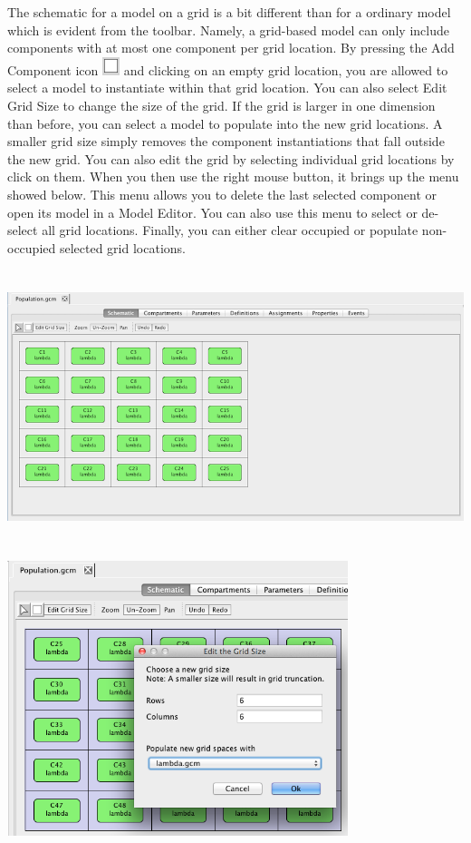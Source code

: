 \documentclass[titlepage,11pt]{article}
\begin{document}
The schematic for a model on a grid is a bit different than for a ordinary model which is evident from the toolbar.  Namely, a grid-based model can only include components with at most one component per grid location.  By pressing the Add Component icon \includegraphics{../gui/icons/modelview/add_component_selected} and clicking on an empty grid location, you are allowed to select a model to instantiate within that grid location.  You can also select Edit Grid Size to change the size of the grid.  If the grid is larger in one dimension than before, you can select a model to populate into the new grid locations.  A smaller grid size simply removes the component instantiations that fall outside the new grid.  You can also edit the grid by selecting individual grid locations by click on them.  When you then use the right mouse button, it brings up the menu showed below.  This menu allows you to delete the last selected component or open its model in a Model Editor.  You can also use this menu to select or de-select all grid locations.  Finally, you can either clear occupied or populate non-occupied selected grid locations.

\begin{center}
\includegraphics[height=80mm]{screenshots/gridModel}
\end{center}

\begin{center}
\includegraphics[height=80mm]{screenshots/editGridSize}
\end{center}
\end{document}
